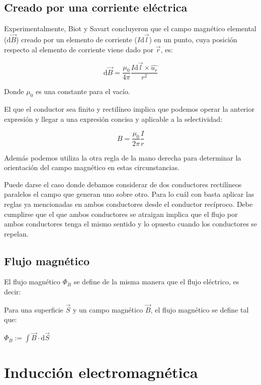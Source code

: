 \documentclass[10pt]{article}
\newcommand{\diff}{\mathrm{d}}
\begin{document}
\subsection{Creado por una corriente eléctrica}

Experimentalmente, Biot y Savart concluyeron que el campo magnético elemental ($ \diff \vec{B} $) creado por un elemento de corriente ($ I \diff \vec{l} $) en un punto, cuya posición
respecto al elemento de corriente viene dado por $ \vec{r} $, es:

\[ \diff \vec{B} = \frac{\mu_0}{4 \pi} \frac{I \diff \vec{l} \times \hat{u_r}}{r^2} \]

Donde $ \mu_0 $ es una constante para el vacío.

El que el conductor sea finito y rectilíneo implica que podemos operar la anterior expresión y llegar a una expresión concisa y aplicable a la selectividad:

\[ B = \frac{\mu_0}{2\pi} \frac{I}{r} \]

Además podemos utiliza la otra regla de la mano derecha para determinar la orientación del campo magnético en estas circunstancias.

\begin{remark}
  Puede darse el caso donde debamos considerar de dos conductores rectilíneos paralelos el campo que generan uno sobre otro. Para lo cuál con basta aplicar las reglas ya mencionadas en 
  ambos conductores desde el conductor recíproco. Debe cumplirse que el que ambos conductores se atraigan implica que el flujo por ambos conductores tenga el mismo sentido y lo opuesto
  cuando los conductores se repelan.
\end{remark}

\subsection{Flujo magnético}

El flujo magnético $ \Phi_B $ se define de la misma manera que el flujo eléctrico, es decir:

\begin{definition}
  Para una superficie $ \vec{S} $ y un campo magnético $ \vec{B} $, el flujo magnético se define tal que:

  $ \Phi_B := \int \vec{B} \cdot \diff \vec{S} $
\end{definition}

\section{Inducción electromagnética}
\end{document}
